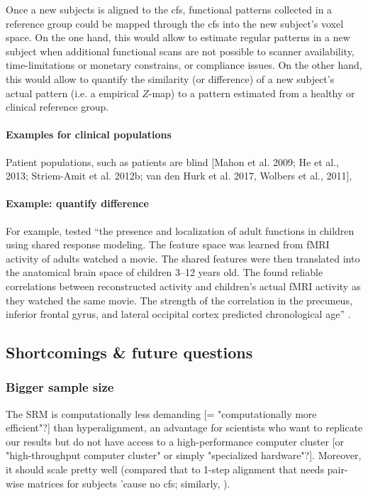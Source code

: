 %
Once a new subjects is aligned to the \ac{cfs}, functional patterns collected in
a reference group could be mapped through the \ac{cfs} into the new subject's
voxel space.
%
On the one hand, this would allow to estimate regular patterns in a new subject
when additional functional scans are not possible to scanner availability,
time-limitations or monetary constrains, or compliance issues.
%
On the other hand, this would allow to quantify the similarity (or difference)
of a new subject's actual pattern (i.e. a empirical $Z$-map) to a pattern
estimated from a healthy or clinical reference group.


\paragraph{Examples for clinical populations}

%
Patient populations, such as patients are blind
%
[Mahon et al. 2009; He et al., 2013; Striem-Amit et al. 2012b; van den Hurk et
al. 2017, Wolbers et al., 2011],
%

\paragraph{Example: \citet{yates2021emergence} quantify difference}


For example, \citet{yates2021emergence} tested ``the presence and localization
of adult functions in children using shared response modeling.
%
The feature space was learned from fMRI activity of adults watched a movie.
%
The shared features were then translated into the anatomical brain space of
children 3--12 years old.
%
The found reliable correlations between reconstructed activity and children's
actual fMRI activity as they watched the same movie.
%
The strength of the correlation in the precuneus, inferior frontal gyrus, and
lateral occipital cortex predicted chronological age''
\citep{yates2021emergence}.



\subsection{Shortcomings \& future questions}

\subsubsection{Bigger sample size}
%
The SRM is computationally less demanding [= "computationally more efficient"?]
than hyperalignment, an advantage for scientists who want to replicate our
results but do not have access to a high-performance computer cluster [or
"high-throughput computer cluster" or simply "specialized hardware"?].
%
Moreover, it should scale pretty well (compared that to
\citep{jiahui2020predicting, jiahui2022cross} 1-step alignment that needs
pair-wise matrices for subjects 'cause no \ac{cfs}; similarly,
\citep{busch2021hybrid}).


